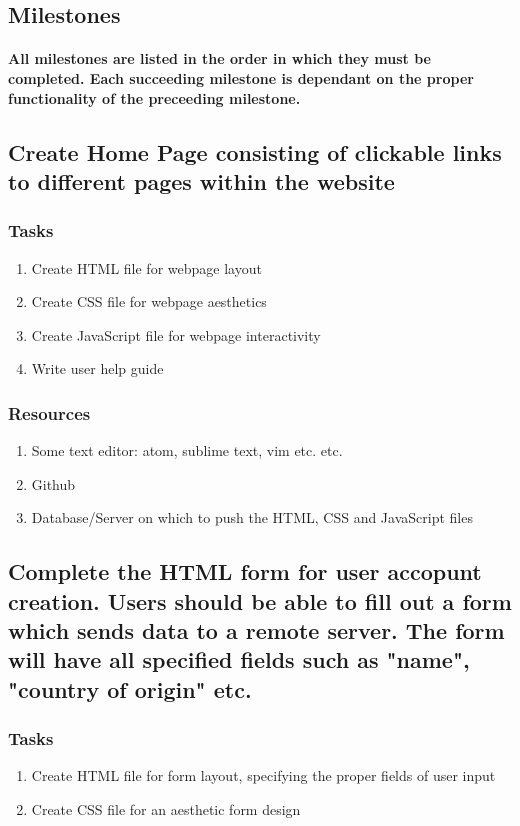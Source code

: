 \documentclass[12pt]{article}
\begin{document}
	\subsection{\bf Milestones}
		\paragraph{\normalfont All milestones are listed in the order in which they must be completed. Each succeeding milestone is dependant on the proper functionality of the preceeding milestone.
		}
		\subsection{\bf Create Home Page consisting of clickable links to different pages within the website}
			\subsubsection{\bf Tasks}
				\begin{enumerate}
					\item Create HTML file for webpage layout
					\item Create CSS file for webpage aesthetics
					\item Create JavaScript file for webpage interactivity
					\item Write user help guide
				\end{enumerate}
			\subsubsection{\bf Resources}
		 		\begin{enumerate}
					\item Some text editor: atom, sublime text, vim etc. etc.
 					\item Github
			 		\item Database/Server on which to push the HTML, CSS and JavaScript files
				\end{enumerate}

		\subsection{\bf Complete the HTML form for user accopunt creation. Users should be able to fill out a form which sends data to a remote server. The form will have all specified fields such as "name", "country of origin" etc.}
			\subsubsection{\bf Tasks}
				\begin{enumerate}
					\item Create HTML file for form layout, specifying the proper fields of user input
					\item Create CSS file for an aesthetic form design
				\end{enumerate}
\end{document}
